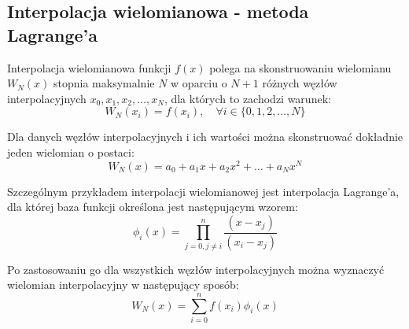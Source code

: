 \documentclass[a4paper,12pt]{article}
\begin{document}
	\subsection{Interpolacja wielomianowa - metoda Lagrange'a}
	Interpolacja wielomianowa funkcji $f(x)$ polega na skonstruowaniu wielomianu $W_{N}(x)$ stopnia maksymalnie $N$ w oparciu o $N+1$ różnych węzłów interpolacyjnych $x_0, x_1, x_2, \dots, x_{N}$, dla których to zachodzi warunek:
	\begin{equation}
	W_N(x_i) = f(x_i), \quad \forall i \in \{0, 1, 2, \dots, N\}
	\end{equation}
	\par Dla danych węzłów interpolacyjnych i ich wartości można skonstruować dokładnie jeden wielomian o postaci:
	\begin{equation}
	W_N(x) = a_0 + a_1x + a_2x^2 + \dots + a_Nx^N
	\end{equation}
	\par Szczególnym przykładem interpolacji wielomianowej jest interpolacja Lagrange'a, dla której baza funkcji określona jest następującym wzorem:
	\begin{equation}
	\phi_i(x) = \prod_{j=0, j \neq i}^n \frac{(x - x_j)}{(x_i - x_j)}
	\end{equation}
	\par Po zastosowaniu go dla wszystkich węzłów interpolacyjnych można wyznaczyć wielomian interpolacyjny w następujący sposób:
	\begin{equation}
    W_N(x) = \sum_{i=0}^n f(x_i)\phi_i(x)
  	\end{equation}
  	
\end{document}
